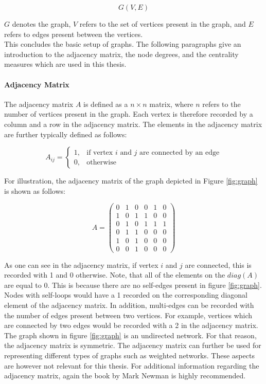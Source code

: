 	\begin{equation}
		G(V,E)
	\end{equation}

	\noindent $G$ denotes the graph, $V$ refers to the set of vertices present 
	in the graph, and $E$ refers to edges present between the vertices. \\

	\noindent This concludes the basic setup of graphs. The following 
	paragraphs give an introduction to the adjacency matrix, the node degrees, and 
	the centrality measures which are used in this thesis.

	\paragraph{Adjacency Matrix} \mbox{} 

	\noindent The adjacency matrix $A$ is defined as a $n \times n$ matrix, 
	where $n$ refers to the number of vertices present in the graph. Each 
	vertex is therefore recorded by a column and a row in the adjacency matrix. 
	The elements in the adjacency matrix are further typically defined as follows:

	\begin{equation}
		A_{ij} = 
			\begin{cases}
				1, & \text{if vertex $i$ and $j$ are connected by an edge} \\
				0, & \text{otherwise}
			\end{cases}
	\end{equation}
	
	\noindent For illustration, the adjacency matrix of the graph depicted in 
	Figure \ref{fig:graph} is shown as follows:

	\[ A = 
	\begin{pmatrix}
		0 & 1 & 0 & 0 & 1 & 0 \\
		1 & 0 & 1 & 1 & 0 & 0 \\
		0 & 1 & 0 & 1 & 1 & 1 \\
		0 & 1 & 1 & 0 & 0 & 0 \\
		1 & 0 & 1 & 0 & 0 & 0 \\
		0 & 0 & 1 & 0 & 0 & 0  
	\end{pmatrix}
	\] 
	
	\noindent As one can see in the adjacency matrix, if vertex $i$ and $j$ are 
	connected, this is recorded with 1 and 0 otherwise. Note, that all of the 
	elements on the $diag(A)$ are equal to 0. This is because there are no 
	self-edges present in figure \ref{fig:graph}. Nodes with self-loops would 
	have a 1 recorded on the corresponding diagonal element of the adjacency 
	matrix. In addition, multi-edges can be recorded with the number of edges
	present between two vertices. For example, vertices which are connected by
	two edges would be recorded with a 2 in the adjacency matrix. The graph
	shown in figure \ref{fig:graph} is an undirected network. For that reason, 
	the adjacency matrix is symmetric. The adjacency matrix can further be used 
	for representing different types of graphs such as weighted networks. These 
	aspects are however not relevant for this thesis. For additional information 
	regarding the adjacency matrix, again the book by Mark Newman 
	\citeyearpar{Newman2010} is highly recommended. 

